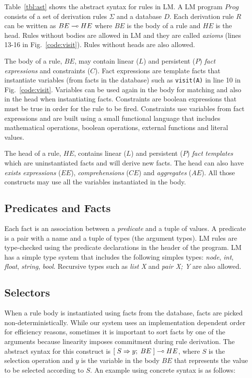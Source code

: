 \renewcommand{\arraystretch}{1.0}

Table~\ref{tbl:ast} shows the abstract syntax for rules in LM.
A LM program $Prog$ consists of a set of derivation rules $\Sigma$ and a database $D$.
Each derivation rule $R$ can be written as $BE \multimap HE$ where $BE$ is the body of a rule and
$HE$ is the head. Rules without bodies are allowed in LM and they are called \textit{axioms} (lines 13-16 in Fig.~\ref{code:visit}). Rules without heads are also allowed.

The body of a rule, $BE$, may contain linear ($L$) and persistent ($P$) \emph{fact expressions}
and constraints ($C$). Fact expressions are template facts that instantiate variables
(from facts in the database)
such as \texttt{visit(A)} in line 10 in Fig.~\ref{code:visit}. Variables can be used again in the body for matching and
also in the head when instantiating facts. Constraints are boolean expressions that must
be true in order for the rule to be fired. Constraints use variables from fact expressions and are built using a small functional language that includes mathematical operations, boolean operations, external functions and literal values.

The head of a rule, $HE$, contains linear ($L$) and persistent ($P$) \emph{fact templates} which are uninstantiated facts and will derive new facts. The head can also have \emph{exists expressions} ($EE$), \emph{comprehensions} ($CE$) and \emph{aggregates} ($AE$). All those constructs
may use all the variables instantiated in the body.

\subsection{Predicates and Facts}

Each fact is an association between a \emph{predicate} and a tuple of values. A predicate is a pair with a name and a tuple of types (the argument types). LM rules are type-checked using the predicate declarations in the header of the program. LM has a simple type system that includes the following simples types: \emph{node}, \emph{int}, \emph{float}, \emph{string}, \emph{bool}. Recursive types such as \emph{list X} and \emph{pair X; Y} are
also allowed.

\subsection{Selectors}

When a rule body is instantiated using facts from the database, facts are picked
non-deterministically. While our system uses an implementation dependent order for
efficiency reasons, sometimes it is important to sort facts by one of the arguments
because linearity imposes commitment during rule derivation. The abstract syntax for
this construct is $[\; S \Rightarrow y; \; BE \;] \multimap HE$, where
$S$ is the selection operation and $y$ is the variable in the body $BE$ that
represents the value to be selected according to $S$.
An example using concrete syntax is as follows:

